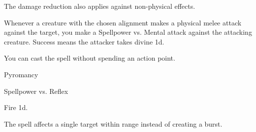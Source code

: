 The damage reduction also applies against non-physical effects.







Whenever a creature with the chosen alignment makes a physical melee attack against the target, you make a Spellpower vs. Mental attack against the attacking creature.
Success means the attacker takes divine  \minus1d.






You can cast the spell without spending an action point.




\newpage
\begin{spellsection}{Pyromancy}

\begin{spellheader}
\end{spellheader}

\begin{spellcontent}

\begin{spelltargetinginfo}




\end{spelltargetinginfo}


\begin{spelleffects}




\begin{spellattack}{Spellpower vs. Reflex}


\spellsuccess Fire  \minus1d.


\end{spellattack}





\end{spelleffects}

\end{spellcontent}
\begin{spellfooter}


\end{spellfooter}
\begin{spellsubcontent}


\begin{spellcantrip}
The spell affects a single target within range instead of creating a burst.
\end{spellcantrip}


\end{spellsubcontent}
\end{spellsection}


